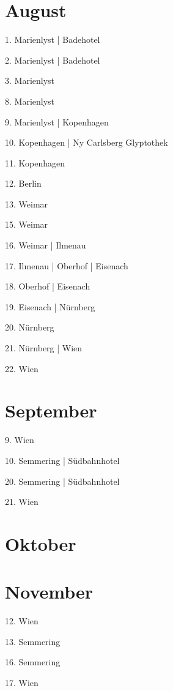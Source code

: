 \documentclass[twoside=false,titlepage=false,open=any, parskip=never, fontsize=10pt, headings=small, chapterprefix=false, appendixprefix=false, DIV=15]{scrbook}
\begin{document}
\begin{multicols}{3}
            \section*{August}
            1. Marienlyst | Badehotel\par
            2. Marienlyst | Badehotel\par
            3. Marienlyst\par
            8. Marienlyst\par
            9. Marienlyst | Kopenhagen\par
            10. Kopenhagen | Ny Carlsberg Glyptothek\par
            11. Kopenhagen\par
            12. Berlin\par
            13. Weimar\par
            15. Weimar\par
            16. Weimar | Ilmenau\par
            17. Ilmenau | Oberhof | Eisenach\par
            18. Oberhof | Eisenach\par
            19. Eisenach | Nürnberg\par
            20. Nürnberg\par
            21. Nürnberg | Wien\par
            22. Wien\par
            \section*{September}
            9. Wien\par
            10. Semmering | Südbahnhotel\par
            20. Semmering | Südbahnhotel\par
            21. Wien\par
            \section*{Oktober}
            \section*{November}
            12. Wien\par
            13. Semmering\par
            16. Semmering\par
            17. Wien\par

\end{multicols}
\end{document}
